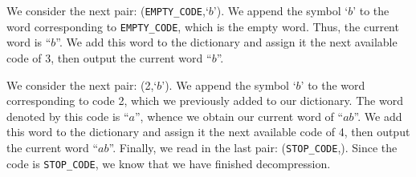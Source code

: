 We consider the next pair: (\texttt{EMPTY\_CODE},\;`$b$'). We append the symbol
`$b$' to the word corresponding to \texttt{EMPTY\_CODE}, which is the empty
word. Thus, the current word is ``$b$''. We add this word to the dictionary and
assign it the next available code of 3, then output the current word ``$b$''.

We consider the next pair: (2,\;`$b$'). We append the symbol `$b$' to the word
corresponding to code 2, which we previously added to our dictionary. The word
denoted by this code is ``$a$'', whence we obtain our current word of ``$ab$''.
We add this word to the dictionary and assign it the next available code of 4,
then output the current word ``$ab$''. Finally, we read in the last pair:
(\texttt{STOP\_CODE},). Since the code is \texttt{STOP\_CODE}, we know that
we have finished decompression.

